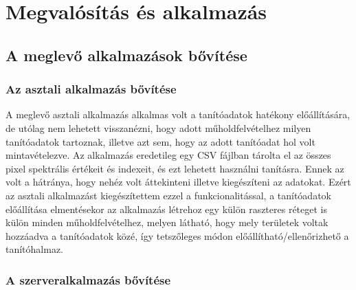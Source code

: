 \chapter{Megvalósítás és alkalmazás}
\label{ch:impl}

\section{A meglevő alkalmazások bővítése}
\label{ch:application-improvement}

\subsection {Az asztali alkalmazás bővítése}

A meglevő asztali alkalmazás alkalmas volt a tanítóadatok hatékony előállítására, de utólag nem lehetett visszanézni, hogy adott műholdfelvételhez milyen tanítóadatok tartoznak, illetve azt sem, hogy az adott tanítóadat hol volt mintavételezve. Az alkalmazás eredetileg egy CSV fájlban \cite{rfc4180} tárolta el az összes pixel spektrális értékeit és indexeit, és ezt lehetett használni tanításra. Ennek az volt a hátránya, hogy nehéz volt áttekinteni illetve kiegészíteni az adatokat. Ezért az asztali alkalmazást kiegészítettem ezzel a funkcionalitással, a tanítóadatok előállítása elmentésekor az alkalmazás létrehoz egy külön raszteres réteget is külön minden műholdfelvételhez, melyen látható, hogy mely területek voltak hozzáadva a tanítóadatok közé, így tetszőleges módon előállítható/ellenőrizhető a tanítóhalmaz.

\subsection {A szerveralkalmazás bővítése}

